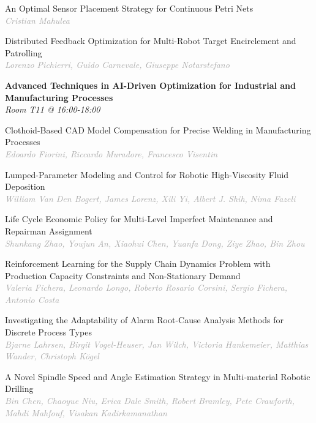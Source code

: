 \begin{multicols*}{2}
\small An Optimal Sensor Placement Strategy for Continuous Petri Nets\\ 
\footnotesize \textcolor{darkgray}{\textit{Cristian Mahulea}}

\small Distributed Feedback Optimization for Multi-Robot Target Encirclement and Patrolling\\ 
\footnotesize \textcolor{darkgray}{\textit{Lorenzo Pichierri, Guido  Carnevale, Giuseppe  Notarstefano}}

\normalsize \textbf{Advanced Techniques in AI-Driven Optimization for Industrial and Manufacturing Processes}\\
\small \textit{Room T11 @ 16:00-18:00}

\small Clothoid-Based CAD Model Compensation for Precise Welding in Manufacturing Processes\\ 
\footnotesize \textcolor{darkgray}{\textit{Edoardo Fiorini, Riccardo  Muradore, Francesco  Visentin}}

\small Lumped-Parameter Modeling and Control for Robotic High-Viscosity Fluid Deposition\\ 
\footnotesize \textcolor{darkgray}{\textit{William Van Den Bogert, James  Lorenz, Xili  Yi, Albert J.  Shih, Nima  Fazeli}}

\small Life Cycle Economic Policy for Multi-Level Imperfect Maintenance and Repairman Assignment\\ 
\footnotesize \textcolor{darkgray}{\textit{Shunkang Zhao, Youjun  An, Xiaohui  Chen, Yuanfa  Dong, Ziye  Zhao, Bin  Zhou}}

\small Reinforcement Learning for the Supply Chain Dynamics Problem with Production Capacity Constraints and Non-Stationary Demand\\ 
\footnotesize \textcolor{darkgray}{\textit{Valeria Fichera, Leonardo  Longo, Roberto Rosario  Corsini, Sergio  Fichera, Antonio  Costa}}

\small Investigating the Adaptability of Alarm Root-Cause Analysis Methods for Discrete Process Types\\ 
\footnotesize \textcolor{darkgray}{\textit{Bjarne Lahrsen, Birgit  Vogel-Heuser, Jan  Wilch, Victoria  Hankemeier, Matthias  Wander, Christoph  Kögel}}

\small A Novel Spindle Speed and Angle Estimation Strategy in Multi-material Robotic Drilling\\ 
\footnotesize \textcolor{darkgray}{\textit{Bin Chen, Chaoyue  Niu, Erica Dale  Smith, Robert  Bramley, Pete  Crawforth, Mahdi  Mahfouf, Visakan  Kadirkamanathan}}


\end{multicols*}
